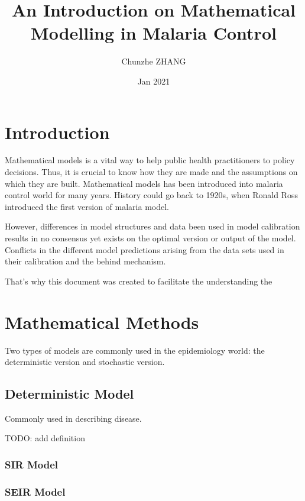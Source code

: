 \documentclass[a4paper, 12pt, twoside]{article}
\title{An Introduction on Mathematical Modelling in Malaria Control}
\author{Chunzhe ZHANG}
\date{Jan 2021}
\begin{document}
\begin{titlepage}
\maketitle
\end{titlepage}

\tableofcontents

\section{Introduction}
Mathematical models is a vital way to help public health practitioners to policy decisions. Thus, it is crucial to know how they are made and the assumptions on which they are built. Mathematical models has been introduced into malaria control world for many years. History could go back to 1920s, when Ronald Ross introduced the first version of malaria model.

However, differences in model structures and data been used in model calibration results in no consensus yet exists on the optimal version or output of the model. Conflicts in the different model predictions arising from the data sets used in their calibration and the behind mechanism. 

That's why this document was created to facilitate the understanding the 

\section{Mathematical Methods}

Two types of models are commonly used in the epidemiology world: the deterministic version and stochastic version.

\subsection{Deterministic Model}

Commonly used in describing disease. 

TODO: add definition

\subsubsection{SIR Model}

\subsubsection{SEIR Model}
\end{document}
